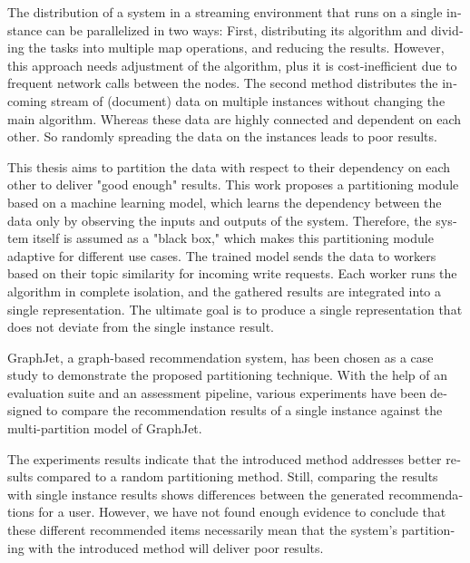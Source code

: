 
\null\vfil
\begin{otherlanguage}{english}
\begin{center}\textsf{\textbf{\abstractname}}\end{center}

\noindent
The distribution of a system in a streaming environment that runs on a single instance can be parallelized in two ways: First, distributing its algorithm and dividing the tasks into multiple map operations, and reducing the results. However, this approach needs adjustment of the algorithm, plus it is cost-inefficient due to frequent network calls between the nodes. The second method distributes the incoming stream of (document) data on multiple instances without changing the main algorithm. Whereas these data are highly connected and dependent on each other. So randomly spreading the data on the instances leads to poor results.

This thesis aims to partition the data with respect to their dependency on each other to deliver "good enough" results. This work proposes a partitioning module based on a machine learning model, which learns the dependency between the data only by observing the inputs and outputs of the system. Therefore, the system itself is assumed as a "black box," which makes this partitioning module adaptive for different use cases. The trained model sends the data to workers based on their topic similarity for incoming write requests. Each worker runs the algorithm in complete isolation, and the gathered results are integrated into a single representation. The ultimate goal is to produce a single representation that does not deviate from the single instance result.

GraphJet, a graph-based recommendation system, has been chosen as a case study to demonstrate the proposed partitioning technique. With the help of an evaluation suite and an assessment pipeline, various experiments have been designed to compare the recommendation results of a single instance against the multi-partition model of GraphJet.


The experiments results indicate that the introduced method addresses better results compared to a random partitioning method. Still, comparing the results with single instance results shows differences between the generated recommendations for a user. However, we have not found enough evidence to conclude that these different recommended items necessarily mean that the system's partitioning with the introduced method will deliver poor results.


\end{otherlanguage}
\vfil\null
\newpage

